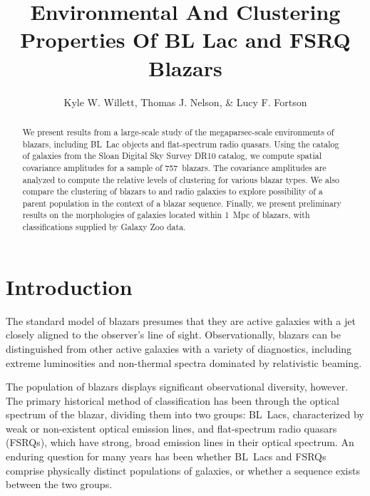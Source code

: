 \documentclass{emulateapj}
\begin{document}
\title{Environmental And Clustering Properties Of BL Lac and FSRQ Blazars}

\author{Kyle W. Willett, Thomas J. Nelson, \& Lucy F. Fortson}


\begin{abstract}
We present results from a large-scale study of the megaparsec-scale environments of blazars, including BL~Lac objects and flat-spectrum radio quasars. Using the catalog of galaxies from the Sloan Digital Sky Survey DR10 catalog, we compute spatial covariance amplitudes for a sample of 757~blazars. The covariance amplitudes are analyzed to compute the relative levels of clustering for various blazar types. We also compare the clustering of blazars to \FRI{} and \FRII{} radio galaxies to explore possibility of a parent population in the context of a blazar sequence. Finally, we present preliminary results on the morphologies of galaxies located within 1~Mpc of blazars, with classifications supplied by Galaxy Zoo data.
\end{abstract}


\section{Introduction} \label{sec-intro}


The standard model of blazars presumes that they are active galaxies with a jet closely aligned to the observer's line of sight. Observationally, blazars can be distinguished from other active galaxies with a variety of diagnostics, including extreme luminosities and non-thermal spectra dominated by relativistic beaming. 

The population of blazars displays significant observational diversity, however. The primary historical method of classification has been through the optical spectrum of the blazar, dividing them into two groups: BL~Lacs, characterized by weak or non-existent optical emission lines, and flat-spectrum radio quasars (FSRQs), which have strong, broad emission lines in their optical spectrum. An enduring question for many years has been whether BL~Lacs and FSRQs comprise physically distinct populations of galaxies, or whether a sequence exists between the two groups. 
\end{document}
